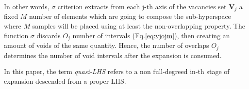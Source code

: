 \documentclass[12pt]{extarticle}
\newcommand{\meqref}[1]{Eq.\ref{#1}}
\begin{document}
In other words, $\sigma$ criterion extracts from each j-th axis of the vacancies set $\textbf{V}_j$ a fixed $M$ number of elements which are going to compose the sub-hyperspace where $M$ samples will be placed using at least the non-overlapping property. The function $\sigma$ discards $O_j$ number of intervals (\meqref{eq:vjojm}), then creating an amount of voids of the same quantity. Hence, the number of overlaps $O_j$ determines the number of void intervals after the expansion is consumed.

In this paper, the term \textit{quasi-LHS} refers to a non full-degreed in-th stage of expansion descended from a proper LHS.

\begin{figure}[]
    \centering
    \begin{subfigure}[b]{0.45\textwidth}
        \centering
    \end{subfigure}
    \hspace{0.05\textwidth}
    \begin{subfigure}[b]{0.45\textwidth}
        \centering
        \vtop{
        	\vspace{0pt}
}
\end{subfigure}
\end{figure}
\end{document}
